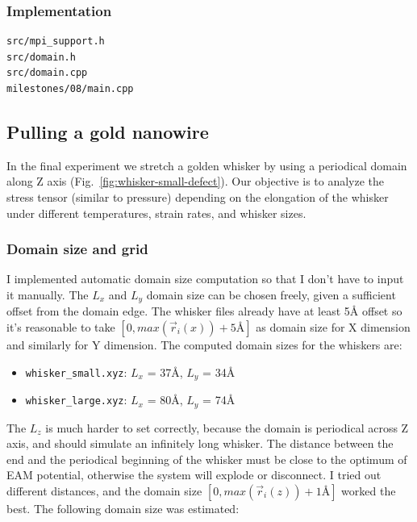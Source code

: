 \documentclass[12pt,a4paper]{article}
\newcommand{\mat}[1]{\vec{#1}}
\begin{document}
\subsubsection*{Implementation}
\begin{lstlisting}[breaklines]
src/mpi_support.h
src/domain.h
src/domain.cpp
milestones/08/main.cpp
\end{lstlisting}

\clearpage %

\subsection*{Pulling a gold nanowire}

In the final experiment we stretch a golden whisker by using a periodical domain along Z axis (Fig.~\ref{fig:whisker-small-defect}). Our objective is to analyze the stress tensor (similar to pressure) depending on the elongation of the whisker under different temperatures, strain rates, and whisker sizes.

\subsubsection*{Domain size and grid}

I implemented automatic domain size computation so that I don't have to input it manually. The $L_x$ and $L_y$ domain size can be chosen freely, given a sufficient offset from the domain edge. The whisker files already have at least 5Å offset so it's reasonable to take $[0, max(\mat{r}_i(x)) + 5\text{Å}]$ as domain size for X dimension and similarly for Y dimension. The computed domain sizes for the whiskers are:

\begin{itemize}
	\item \verb|whisker_small.xyz|: $L_x$ = 37Å, $L_y$ = 34Å
	\item \verb|whisker_large.xyz|: $L_x$ = 80Å, $L_y$ = 74Å
\end{itemize}

The $L_z$ is much harder to set correctly, because the domain is periodical across Z axis, and should simulate an infinitely long whisker. The distance between the end and the periodical beginning of the whisker must be close to the optimum of EAM potential, otherwise the system will explode or disconnect. I tried out different distances, and the domain size $[0, max(\mat{r}_i(z)) + 1\text{Å}]$ worked the best. The following domain size was estimated:
\end{document}
